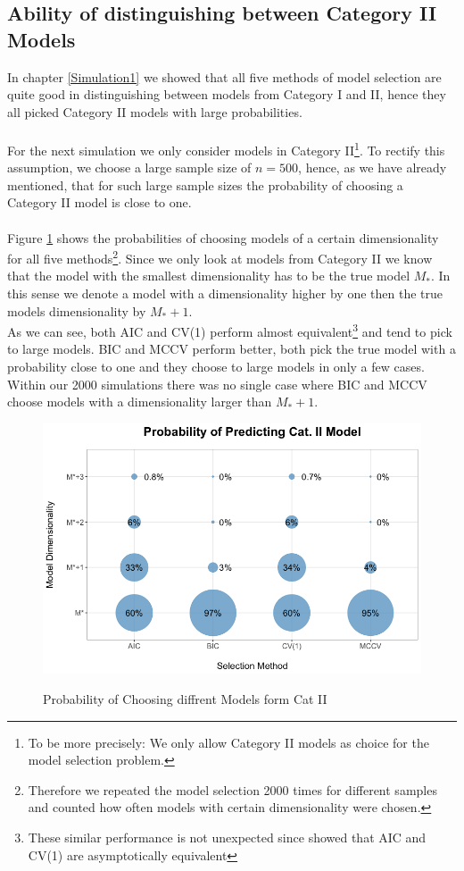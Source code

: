 \documentclass[Research_Module_ES.tex]{subfiles}
\begin{document}
\subsection{Ability of distinguishing  between Category II Models}
In chapter \ref{Simulation1} we showed that all five methods of model selection are quite good in distinguishing between models from Category I and II, hence they all picked Category II models with large probabilities. \\
\\
For the next simulation we only consider models in Category II\footnote{To be more precisely: We only allow Category II models as choice for the model selection problem.}. To rectify this assumption, we choose a large sample size of $n=500$, hence, as we have already mentioned, that for such large sample sizes the probability of choosing a Category II model is close to one.\\
\\
Figure \ref{Simulation2} shows the probabilities of choosing models of a certain dimensionality for all five methods\footnote{Therefore we repeated the model selection 2000 times for different samples and counted how often models with certain dimensionality were chosen.}. Since we only look at models from Category II we know that the model with the smallest dimensionality has to be the true model $M_\ast$. In this sense we denote a model with a dimensionality higher by one then the true models dimensionality by $M_\ast+1$.\\
As we can see, both AIC and CV(1) perform almost equivalent\footnote{These similar performance is not unexpected since \cite{stone1977asymptotic} showed that AIC and CV(1) are asymptotically equivalent} and tend to pick to large models. BIC and MCCV  perform better, both pick the true model with a probability close to one and they choose to large models in only a few cases. Within our 2000 simulations there was no single case where BIC and MCCV choose models with a dimensionality larger than $M_\ast+1$.
\begin{figure}[!h]
	\label{Simulation2}
	\centering
	\includegraphics[width=1\textwidth]{Simulation2.png}\\
	\caption{Probability of Choosing diffrent Models form Cat II}
\end{figure}
\end{document}

